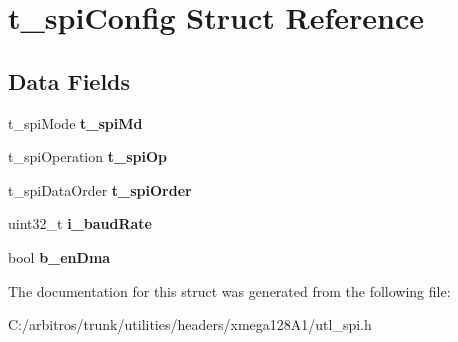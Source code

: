 \hypertarget{structt__spi_config}{\section{t\-\_\-spi\-Config Struct Reference}
\label{structt__spi_config}
}
\subsection*{Data Fields}
\begin{DoxyCompactItemize}
\item 
\hypertarget{structt__spi_config_a3eb99d208acd23dfd3b5ef29b886d986}{t\-\_\-spi\-Mode {\bfseries t\-\_\-spi\-Md}}\label{structt__spi_config_a3eb99d208acd23dfd3b5ef29b886d986}

\item 
\hypertarget{structt__spi_config_a9fdac7dfe9cccf3055f8cc674adef81f}{t\-\_\-spi\-Operation {\bfseries t\-\_\-spi\-Op}}\label{structt__spi_config_a9fdac7dfe9cccf3055f8cc674adef81f}

\item 
\hypertarget{structt__spi_config_a9d6c8c1f35fa405610792ebdfe2f2775}{t\-\_\-spi\-Data\-Order {\bfseries t\-\_\-spi\-Order}}\label{structt__spi_config_a9d6c8c1f35fa405610792ebdfe2f2775}

\item 
\hypertarget{structt__spi_config_ac316d01a82a05edc681fdfe0bac24060}{uint32\-\_\-t {\bfseries i\-\_\-baud\-Rate}}\label{structt__spi_config_ac316d01a82a05edc681fdfe0bac24060}

\item 
\hypertarget{structt__spi_config_a0b2c2b061a5702adb4b17f49e1c3aa79}{bool {\bfseries b\-\_\-en\-Dma}}\label{structt__spi_config_a0b2c2b061a5702adb4b17f49e1c3aa79}

\end{DoxyCompactItemize}


The documentation for this struct was generated from the following file\-:\begin{DoxyCompactItemize}
\item 
C\-:/arbitros/trunk/utilities/headers/xmega128\-A1/utl\-\_\-spi.\-h\end{DoxyCompactItemize}
